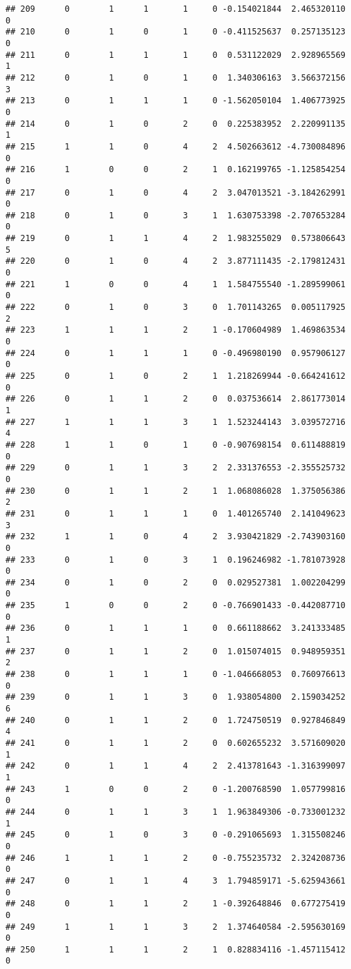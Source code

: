 \documentclass[]{article}
\begin{document}
\begin{verbatim}
## 209      0        1      1       1     0 -0.154021844  2.465320110     0
## 210      0        1      0       1     0 -0.411525637  0.257135123     0
## 211      0        1      1       1     0  0.531122029  2.928965569     1
## 212      0        1      0       1     0  1.340306163  3.566372156     3
## 213      0        1      1       1     0 -1.562050104  1.406773925     0
## 214      0        1      0       2     0  0.225383952  2.220991135     1
## 215      1        1      0       4     2  4.502663612 -4.730084896     0
## 216      1        0      0       2     1  0.162199765 -1.125854254     0
## 217      0        1      0       4     2  3.047013521 -3.184262991     0
## 218      0        1      0       3     1  1.630753398 -2.707653284     0
## 219      0        1      1       4     2  1.983255029  0.573806643     5
## 220      0        1      0       4     2  3.877111435 -2.179812431     0
## 221      1        0      0       4     1  1.584755540 -1.289599061     0
## 222      0        1      0       3     0  1.701143265  0.005117925     2
## 223      1        1      1       2     1 -0.170604989  1.469863534     0
## 224      0        1      1       1     0 -0.496980190  0.957906127     0
## 225      0        1      0       2     1  1.218269944 -0.664241612     0
## 226      0        1      1       2     0  0.037536614  2.861773014     1
## 227      1        1      1       3     1  1.523244143  3.039572716     4
## 228      1        1      0       1     0 -0.907698154  0.611488819     0
## 229      0        1      1       3     2  2.331376553 -2.355525732     0
## 230      0        1      1       2     1  1.068086028  1.375056386     2
## 231      0        1      1       1     0  1.401265740  2.141049623     3
## 232      1        1      0       4     2  3.930421829 -2.743903160     0
## 233      0        1      0       3     1  0.196246982 -1.781073928     0
## 234      0        1      0       2     0  0.029527381  1.002204299     0
## 235      1        0      0       2     0 -0.766901433 -0.442087710     0
## 236      0        1      1       1     0  0.661188662  3.241333485     1
## 237      0        1      1       2     0  1.015074015  0.948959351     2
## 238      0        1      1       1     0 -1.046668053  0.760976613     0
## 239      0        1      1       3     0  1.938054800  2.159034252     6
## 240      0        1      1       2     0  1.724750519  0.927846849     4
## 241      0        1      1       2     0  0.602655232  3.571609020     1
## 242      0        1      1       4     2  2.413781643 -1.316399097     1
## 243      1        0      0       2     0 -1.200768590  1.057799816     0
## 244      0        1      1       3     1  1.963849306 -0.733001232     1
## 245      0        1      0       3     0 -0.291065693  1.315508246     0
## 246      1        1      1       2     0 -0.755235732  2.324208736     0
## 247      0        1      1       4     3  1.794859171 -5.625943661     0
## 248      0        1      1       2     1 -0.392648846  0.677275419     0
## 249      1        1      1       3     2  1.374640584 -2.595630169     0
## 250      1        1      1       2     1  0.828834116 -1.457115412     0
\end{verbatim}
\end{document}

